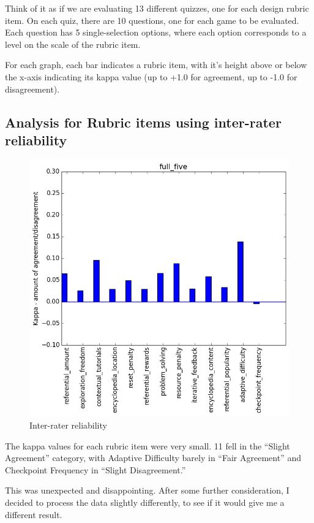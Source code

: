 				Think of it as if we are evaluating 13 different quizzes, one for each design rubric item. On each quiz, there are 10 questions, one for each game to be evaluated. Each question has 5 single-selection options, where each option corresponds to a level on the scale of the rubric item.

				For each graph, each bar indicates a rubric item, with it's height above or below the x-axis indicating its kappa value (up to +1.0 for agreement, up to -1.0 for disagreement).

			\subsection{Analysis for Rubric items using inter-rater reliability}
				\begin{figure}[] 
					\centering 
					\includegraphics[width=\textwidth, height=.4\textheight, keepaspectratio=true]{full_five_stats.png} 
					\caption{Inter-rater reliability}
				\end{figure}

				The kappa values for each rubric item were very small. 11 fell in the ``Slight Agreement'' category, with Adaptive Difficulty barely in ``Fair Agreement'' and Checkpoint Frequency in ``Slight Disagreement.'' 

				This was unexpected and disappointing. After some further consideration, I decided to process the data slightly differently, to see if it would give me a different result.

